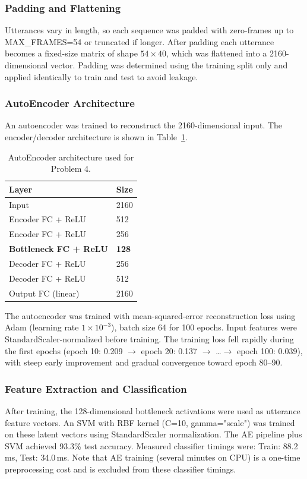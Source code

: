 \subsubsection{Padding and Flattening}
Utterances vary in length, so each sequence was padded with zero-frames up to MAX\_FRAMES=54 or truncated if longer. After padding each utterance becomes a fixed-size matrix of shape $54\times40$, which was flattened into a 2160-dimensional vector. Padding was determined using the training split only and applied identically to train and test to avoid leakage.

\subsubsection{AutoEncoder Architecture}
An autoencoder was trained to reconstruct the 2160-dimensional input. The encoder/decoder architecture is shown in Table~\ref{tab:p4_ae_arch}.

\begin{table}[H]
\centering
\caption{AutoEncoder architecture used for Problem 4.}
\label{tab:p4_ae_arch}
\begin{tabular}{ll}
	\toprule
Layer & Size \\
\midrule
Input & 2160 \\
Encoder FC + ReLU & 512 \\
Encoder FC + ReLU & 256 \\
	\textbf{Bottleneck FC + ReLU} & \textbf{128} \\
Decoder FC + ReLU & 256 \\
Decoder FC + ReLU & 512 \\
Output FC (linear) & 2160 \\
\bottomrule
\end{tabular}
\end{table}

The autoencoder was trained with mean-squared-error reconstruction loss using Adam (learning rate $1\times10^{-3}$), batch size 64 for 100 epochs. Input features were StandardScaler-normalized before training. The training loss fell rapidly during the first epochs (epoch 10: 0.209 $\rightarrow$ epoch 20: 0.137 $\rightarrow$ \ldots $\rightarrow$ epoch 100: 0.039), with steep early improvement and gradual convergence toward epoch 80--90.

\subsubsection{Feature Extraction and Classification}
After training, the 128-dimensional bottleneck activations were used as utterance feature vectors. An SVM with RBF kernel (C=10, gamma="scale") was trained on these latent vectors using StandardScaler normalization. The AE pipeline plus SVM achieved 93.3\% test accuracy. Measured classifier timings were: Train: 88.2\,ms, Test: 34.0\,ms. Note that AE training (several minutes on CPU) is a one-time preprocessing cost and is excluded from these classifier timings.

